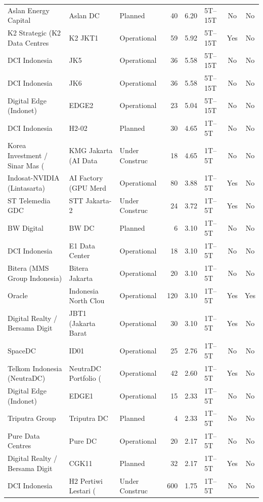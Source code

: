 \documentclass[11pt,english]{article}
\begin{document}
\begin{appendices}
\begin{table}[H]
\begin{threeparttable}
\begin{tabular}{l l l r r l c c}
  Aslan Energy Capital & Aslan DC & Planned & 40 & 6.20 & 5T--15T & No & No \\
  K2 Strategic (K2 Data Centres  & K2 JKT1 & Operational & 59 & 5.92 & 5T--15T & Yes & No \\
  DCI Indonesia & JK5 & Operational & 36 & 5.58 & 5T--15T & No & No \\
  DCI Indonesia & JK6 & Operational & 36 & 5.58 & 5T--15T & No & No \\
  Digital Edge (Indonet) & EDGE2 & Operational & 23 & 5.04 & 5T--15T & No & No \\
  DCI Indonesia & H2-02 & Planned & 30 & 4.65 & 1T--5T & No & No \\
  Korea Investment / Sinar Mas ( & KMG Jakarta (AI Data & Under Construc & 18 & 4.65 & 1T--5T & No & No \\
  Indosat-NVIDIA (Lintasarta) & AI Factory (GPU Merd & Operational & 80 & 3.88 & 1T--5T & Yes & No \\
  ST Telemedia GDC & STT Jakarta-2 & Under Construc & 24 & 3.72 & 1T--5T & Yes & No \\
  BW Digital & BW DC & Planned & 6 & 3.10 & 1T--5T & No & No \\
  DCI Indonesia & E1 Data Center & Operational & 18 & 3.10 & 1T--5T & No & No \\
  Bitera (MMS Group Indonesia) & Bitera Jakarta & Operational & 20 & 3.10 & 1T--5T & No & No \\
  Oracle & Indonesia North Clou & Operational & 120 & 3.10 & 1T--5T & Yes & Yes \\
  Digital Realty / Bersama Digit & JBT1 (Jakarta Barat  & Operational & 30 & 3.10 & 1T--5T & Yes & No \\
  SpaceDC & ID01 & Operational & 25 & 2.76 & 1T--5T & No & No \\
  Telkom Indonesia (NeutraDC) & NeutraDC Portfolio ( & Operational & 42 & 2.60 & 1T--5T & Yes & No \\
  Digital Edge (Indonet) & EDGE1 & Operational & 15 & 2.33 & 1T--5T & No & No \\
  Triputra Group & Triputra DC & Planned & 4 & 2.33 & 1T--5T & No & No \\
  Pure Data Centres & Pure DC & Operational & 20 & 2.17 & 1T--5T & No & No \\
  Digital Realty / Bersama Digit & CGK11 & Planned & 32 & 2.17 & 1T--5T & Yes & No \\
  DCI Indonesia & H2 Pertiwi Lestari ( & Under Construc & 600 & 1.75 & 1T--5T & No & No \\

\end{tabular}
\end{threeparttable}
\end{table}
\end{appendices}
\end{document}
